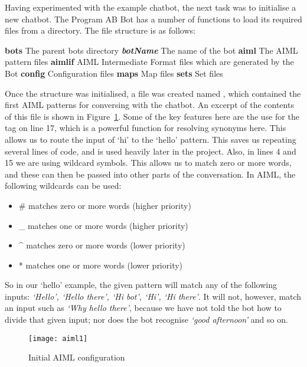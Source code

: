 \newpage
Having experimented with the example chatbot, the next task was to initialise a new chatbot. The Program AB Bot has a number of functions to load its required files from a directory. The file structure is as follows:

\begin{outline}
	\1 \textbf{bots} The parent bots directory
		\2 \textbf{\emph{botName}} The name of the bot
			\3 \textbf{aiml} The AIML pattern files 
			\3 \textbf{aimlif} AIML Intermediate Format files which are generated by the Bot
			\3 \textbf{config} Configuration files
			\3 \textbf{maps} Map files
			\3 \textbf{sets} Set files
\end{outline}
	
Once the structure was initialised, a file was created named , which contained the first AIML patterns for conversing with the chatbot. An excerpt of the contents of this file is shown in Figure~\ref{fig:aiml1}. Some of the key features here are the use for the  tag on line 17, which is a powerful function for resolving synonyms here. This allows us to route the input of `hi' to the `hello' pattern. This saves us repeating several lines of code, and is used heavily later in the project. Also, in lines 4 and 15 we are using wildcard symbols. This allows us to match zero or more words, and these can then be passed into other parts of the conversation. In AIML, the following wildcards can be used:

\begin{itemize}
	\item \# matches zero or more words (higher priority)
	\item \_ matches one or more words (higher priority)
	\item \^{} matches zero or more words (lower priority)
	\item * matches one or more words (lower priority)
\end{itemize}

So in our `hello' example, the given pattern will match any of the following inputs: {\it{`Hello', `Hello there', `Hi bot', `Hi', `Hi there'}}. It will not, however, match an input such as {\it{`Why hello there'}}, because we have not told the bot how to divide that given input; nor does the bot recognise {\it{`good afternoon'}} and so on.

\begin{figure}[h]
	\centering
	\texttt{[image: aiml1]}
	\caption{Initial AIML configuration}
	\label{fig:aiml1}
\end{figure}

